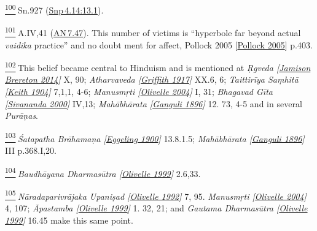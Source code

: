 \label{footprints_split_024.html_fn100}
\hyperref[footprints_split_007.htmlux5cux23fnref100]{\textsuperscript{100}} Sn.927
(\href{https://suttacentral.net/snp4.14/en/sujato\#13.1}{Snp\,4.14:13.1}).

\label{footprints_split_024.html_fn101}
\hyperref[footprints_split_007.htmlux5cux23fnref101]{\textsuperscript{101}} A.IV,41
(\href{https://suttacentral.net/an7.47/en/sujato}{AN\,7.47}). This
number of victims is ``hyperbole far beyond actual \emph{vaidika}
practice'' and no doubt ment for affect, {Pollock 2005
{{[}\hyperref[footprints_split_022.htmlux5cux23Pollockux5cux25202005]{Pollock
2005}{]}}} p.403.

\label{footprints_split_024.html_fn102}
\hyperref[footprints_split_007.htmlux5cux23fnref102]{\textsuperscript{102}} This
belief became central to Hinduism and is mentioned at \emph{{Ṛgveda
{{[}\hyperref[footprints_split_022.htmlux5cux23Jamisonux5cux2520Breretonux5cux25202014]{Jamison
Brereton 2014}{]}}}} X, 90; \emph{{Atharvaveda
{{[}\hyperref[footprints_split_023.htmlux5cux23Griffithux5cux25201917]{Griffith
1917}{]}}}} XX.6, 6; \emph{{Taittirīya Saṃhitā
{{[}\hyperref[footprints_split_023.htmlux5cux23Keithux5cux25201904]{Keith
1904}{]}}}} 7,1,1, 4-6; \emph{{Manusmṛti
{{[}\hyperref[footprints_split_022.htmlux5cux23Olivelleux5cux25202004]{Olivelle
2004}{]}}}} I, 31; \emph{{Bhagavad Gīta
{{[}\hyperref[footprints_split_023.htmlux5cux23Sivanandaux5cux25202000]{Sivananda
2000}{]}}}} IV,13; \emph{{Mahābhārata
{{[}\hyperref[footprints_split_023.htmlux5cux23Ganguliux5cux25201896]{Ganguli
1896}{]}}}} 12. 73, 4-5 and in several \emph{Purāṇas}.

\label{footprints_split_024.html_fn103}
\hyperref[footprints_split_007.htmlux5cux23fnref103]{\textsuperscript{103}} \emph{{Śatapatha
Brāhamaṇa
{{[}\hyperref[footprints_split_023.htmlux5cux23Eggelingux5cux25201900]{Eggeling
1900}{]}}}} 13.8.1.5; \emph{{Mahābhārata
{{[}\hyperref[footprints_split_023.htmlux5cux23Ganguliux5cux25201896]{Ganguli
1896}{]}}}} III p.368.I,20.

\label{footprints_split_024.html_fn104}
\hyperref[footprints_split_007.htmlux5cux23fnref104]{\textsuperscript{104}} \emph{{Baudhāyana
Dharmasūtra
{{[}\hyperref[footprints_split_022.htmlux5cux23Olivelleux5cux25201999]{Olivelle
1999}{]}}}} 2.6,33.

\label{footprints_split_024.html_fn105}
\hyperref[footprints_split_007.htmlux5cux23fnref105]{\textsuperscript{105}} \emph{{Nāradaparivrājaka
Upaniṣad
{{[}\hyperref[footprints_split_022.htmlux5cux23Olivelleux5cux25201992]{Olivelle
1992}{]}}}} 7, 95. \emph{{Manusmṛti
{{[}\hyperref[footprints_split_022.htmlux5cux23Olivelleux5cux25202004]{Olivelle
2004}{]}}}} 4, 107; \emph{{Āpastamba
{{[}\hyperref[footprints_split_022.htmlux5cux23Olivelleux5cux25201999]{Olivelle
1999}{]}}}} 1. 32, 21; and \emph{{Gautama Dharmasūtra
{{[}\hyperref[footprints_split_022.htmlux5cux23Olivelleux5cux25201999]{Olivelle
1999}{]}}}} 16.45 make this same point.

